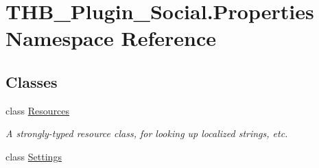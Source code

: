 \hypertarget{namespace_t_h_b___plugin___social_1_1_properties}{}\section{T\+H\+B\+\_\+\+Plugin\+\_\+\+Social.\+Properties Namespace Reference}
\label{namespace_t_h_b___plugin___social_1_1_properties}
\subsection*{Classes}
\begin{DoxyCompactItemize}
\item 
class \mbox{\hyperlink{class_t_h_b___plugin___social_1_1_properties_1_1_resources}{Resources}}
\begin{DoxyCompactList}\small\item\em A strongly-\/typed resource class, for looking up localized strings, etc. \end{DoxyCompactList}\item 
class \mbox{\hyperlink{class_t_h_b___plugin___social_1_1_properties_1_1_settings}{Settings}}
\end{DoxyCompactItemize}
